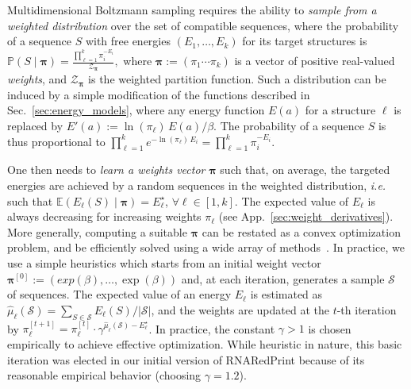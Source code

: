 \documentclass{bioinfo}
\newcommand{\val}{a} %
\newcommand{\partfun}[1]{\mathcal{Z}_{#1}}
\newcommand{\Def}[1]{{\it #1}}
\newcommand{\TargetE}{E^{\star}}
\newcommand{\Software}[1]{{\ttfamily #1}}
\newcommand{\ourprog}{\Software{RNARedPrint}}
\begin{document}
Multidimensional Boltzmann sampling requires the ability to \Def{sample from a weighted distribution} over the set of compatible sequences, where the probability of a sequence $S$ with free energies $(E_1,\ldots,E_k)$ for its target structures is
$\mathbb{P}(S\mid \pmb{\pi}) = \frac{\prod_{\ell=1}^{k} \pi_i^{-E_i}}{\partfun{\pmb{\pi}}},$
where $\pmb{\pi}:=(\pi_1\cdots\pi_k)$ is a vector of positive real-valued \Def{weights}, and $\partfun{\pmb{\pi}}$ is the weighted partition function. Such a distribution can be induced by a simple modification of the functions described in Sec.~\ref{sec:energy_models}, where any energy function $E(\val)$ for a structure $\ell$ is replaced by $E'(\val):= \ln(\pi_\ell)\, E(\val)/\beta$. The probability of a sequence $S$ is thus proportional to 
$ \prod_{\ell=1}^{k} e^{-\ln(\pi_\ell)\, E_i} = \prod_{\ell=1}^{k} \pi_i^{-E_i}. $

One then needs to \Def{learn a weights vector} $\pmb{\pi}$ such that, on average, the targeted energies are achieved by a random sequences in the weighted distribution, \emph{i.e.} such that  $\mathbb{E}(E_\ell(S)\mid \pmb{\pi})=\TargetE_\ell$,  $\forall\ell\in[1,k]$.
The expected value of $E_\ell$ is always decreasing for increasing weights $\pi_\ell$ (see App.~\ref{sec:weight_derivatives}). More generally, computing a suitable $\pmb{\pi}$ can be restated as a convex optimization problem, and be efficiently solved using a wide array of methods~\cite{Denise2010,Bendkowski2017}. 
In practice, we use a simple heuristics which starts from an initial weight vector $\pmb{\pi}^{[0]}:=(exp(\beta),\dots,\exp(\beta))$ and, at each iteration, generates a sample $\mathcal{S}$ of sequences. The expected value of an energy $E_\ell$ is estimated as $\hat\mu_\ell(\mathcal{S}) = \sum_{S\in\mathcal{S}}E_\ell(S)/|\mathcal{S}|$, and the weights are updated at the $t$-th iteration by %
$\pi_\ell^{[t+1]} = \pi_\ell^{[t]}\cdot \gamma^{\hat\mu_\ell(\mathcal{S})-\TargetE_\ell}$. In practice, the constant $\gamma>1$ is chosen empirically to achieve effective optimization. 
While heuristic in nature, this basic iteration was elected in our initial version of \ourprog{} because of its reasonable empirical behavior (choosing $\gamma=1.2$).
\end{document}
